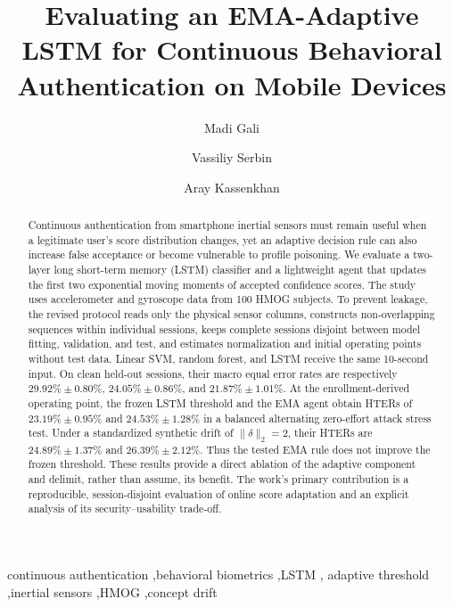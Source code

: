 \documentclass[3p,times,procedia]{elsarticle}
\begin{document}
\begin{frontmatter}

\title{Evaluating an EMA-Adaptive LSTM for Continuous Behavioral
Authentication on Mobile Devices}

\author[a]{Madi Gali}
\author[b]{Vassiliy Serbin}
\author[c]{Aray Kassenkhan}
\address[a]{Department of Cybersecurity, Institute of Automation and
Information Technologies, Satbayev University, Almaty 050013, Kazakhstan}
\address[b]{Department of Information Systems, Institute of Automation and
Information Technologies, Satbayev University, Almaty 050013, Kazakhstan}
\address[c]{Department of Software Engineering, Institute of Automation and
Information Technologies, Satbayev University, Almaty 050013, Kazakhstan}

\begin{abstract}
Continuous authentication from smartphone inertial sensors must remain useful
when a legitimate user's score distribution changes, yet an adaptive decision
rule can also increase false acceptance or become vulnerable to profile
poisoning. We evaluate a two-layer long short-term memory (LSTM) classifier and
a lightweight agent that updates the first two exponential moving moments of
accepted confidence scores. The study uses accelerometer and gyroscope data
from 100 HMOG subjects. To prevent leakage, the revised protocol reads only the
physical sensor columns, constructs non-overlapping sequences within individual
sessions, keeps complete sessions disjoint between model fitting, validation,
and test, and estimates normalization and initial operating points without test
data. Linear SVM, random forest, and LSTM receive the same 10-second input.
On clean held-out sessions, their macro equal error rates are respectively
$29.92\%\pm0.80\%$, $24.05\%\pm0.86\%$, and
$21.87\%\pm1.01\%$. At the enrollment-derived
operating point, the frozen LSTM threshold and the EMA agent obtain HTERs of
$23.19\%\pm0.95\%$ and $24.53\%\pm1.28\%$ in a balanced alternating
zero-effort attack stress test. Under a standardized synthetic drift of
$\lVert\delta\rVert_2=2$, their HTERs are $24.89\%\pm1.37\%$ and
$26.39\%\pm2.12\%$. Thus the tested EMA rule does not improve the frozen
threshold. These results provide a direct ablation of the adaptive
component and delimit, rather than assume, its benefit. The work's primary
contribution is a reproducible, session-disjoint evaluation of online score
adaptation and an explicit analysis of its security--usability trade-off.
\end{abstract}

\begin{keyword}
continuous authentication \sep behavioral biometrics \sep LSTM \sep
adaptive threshold \sep inertial sensors \sep HMOG \sep concept drift
\end{keyword}
\end{frontmatter}
\end{document}

